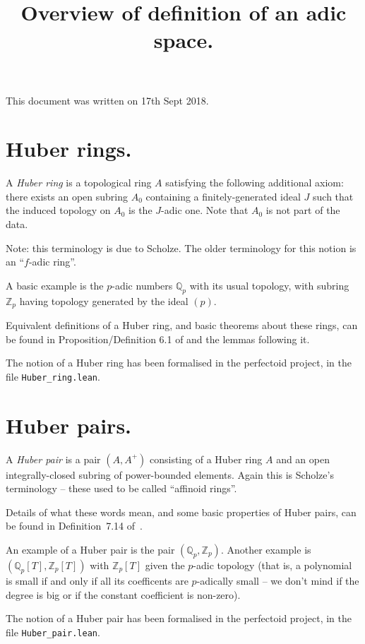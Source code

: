 \documentclass{amsart}
\title{Overview of definition of an adic space.}
\newcommand{\Q}{\mathbb{Q}}
\newcommand{\Z}{\mathbb{Z}}
\theoremstyle{plain}
\theoremstyle{remark}
\begin{document}
\maketitle

This document was written on 17th Sept 2018.

\section{Huber rings.}

A \emph{Huber ring} is a topological ring $A$ satisfying the following additional axiom: there exists an open subring $A_0$ containing a finitely-generated ideal $J$ such that the induced topology on $A_0$ is the $J$-adic one. Note that $A_0$ is not part of the data.

Note: this terminology is due to Scholze. The older terminology for this notion is an ``$f$-adic ring''.

A basic example is the $p$-adic numbers $\Q_p$ with its usual topology, with subring $\Z_p$ having topology generated by the ideal $(p)$.

Equivalent definitions of a Huber ring, and basic theorems about these rings, can be found in Proposition/Definition 6.1 of \cite{Wedhorn} and the lemmas following it.

The notion of a Huber ring has been formalised in the perfectoid project, in the file {\tt Huber\_ring.lean}.

\section{Huber pairs.}

A \emph{Huber pair} is a pair $(A,A^+)$ consisting of a Huber ring $A$ and an open integrally-closed subring of power-bounded elements. Again this is Scholze's terminology -- these used to be called ``affinoid rings''. 

Details of what these words mean, and some basic properties of Huber pairs, can be found in Definition~7.14 of~\cite{Wedhorn}.

An example of a Huber pair is the pair $(\Q_p,\Z_p)$. Another example is $(\Q_p[T],\Z_p[T])$ with $\Z_p[T]$ given the $p$-adic topology (that is, a polynomial is small if and only if all its coefficents are $p$-adically small -- we don't mind if the degree is big or if the constant coefficient is non-zero).

The notion of a Huber pair has been formalised in the perfectoid project, in the file {\tt Huber\_pair.lean}.
\end{document}
